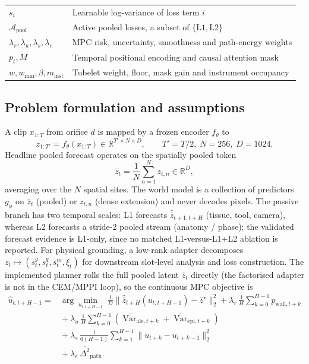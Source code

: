 \documentclass[preprint,12pt]{elsarticle}
\begin{document}
\begin{table}[t]
\begin{tabular}{@{}lp{}@{}}
$s_i$ & Learnable log-variance of loss term $i$ \\
$\mathcal{A}_{\mathrm{pool}}$ & Active pooled losses, a subset of $\{\mathrm{L1},\mathrm{L2}\}$ \\
$\lambda_r,\lambda_u,\lambda_s,\lambda_e$ & MPC risk, uncertainty, smoothness and path-energy weights \\
$p_t,M$ & Temporal positional encoding and causal attention mask \\
$w,w_{\min},\beta,m_{\mathrm{inst}}$ & Tubelet weight, floor, mask gain and instrument occupancy \\
\bottomrule
\end{tabular}
\end{table}

\subsection{Problem formulation and assumptions}
\label{sec:formulation}
A clip $x_{1:T}$ from orifice $d$ is mapped by a frozen encoder $f_\theta$ to
\begin{equation}
z_{1:T'}=f_\theta(x_{1:T})\in\mathbb{R}^{T'\times N\times D},\qquad T'=T/2,\; N=256,\; D=1024.
\label{eq:encode}
\end{equation}
Headline pooled forecast operates on the spatially pooled token
\begin{equation}
\bar z_t=\frac{1}{N}\sum_{n=1}^{N}z_{t,n}\in\mathbb{R}^{D},
\label{eq:pool}
\end{equation}
averaging over the $N$ spatial sites. The world model is a collection of
predictors $g_\phi$ on $\bar z_t$ (pooled) or $z_{t,n}$ (dense extension) and
never decodes pixels. The passive branch has two temporal scales:
L1 forecasts $\hat{\bar z}_{t+1:t+H}$ (tissue, tool, camera), whereas L2 forecasts a
stride-$2$ pooled stream (anatomy / phase); the validated forecast evidence is
L1-only, since no matched L1-versus-L1{+}L2 ablation is reported. For physical grounding, a low-rank
adapter decomposes $z_t\mapsto(s_t^g,s_t^q,s_t^m,\xi_t)$ for downstream
slot-level analysis and loss construction. The implemented planner rolls the
full pooled latent $\bar z_t$ directly (the factorised adapter is not in the
CEM/MPPI loop), so the continuous MPC objective is
\begin{equation}
\begin{aligned}
\hat u_{t:t+H-1}
={}&\arg\min_{u_{t:t+H-1}}\;
\frac{1}{D}\bigl\|\hat{\bar z}_{t+H}(u_{t:t+H-1})-\bar z^\star\bigr\|_2^2
+\lambda_r\,\frac{1}{H}\sum_{k=0}^{H-1}p_{\mathrm{wall},t+k}\\
&{}+\lambda_u\,\frac{1}{H}\sum_{k=0}^{H-1}
(\overline{\operatorname{Var}}_{\mathrm{ale},t+k}
+\overline{\operatorname{Var}}_{\mathrm{epi},t+k})
\\
&{}+\lambda_s\,\frac{1}{6(H-1)}\sum_{k=1}^{H-1}
\|u_{t+k}-u_{t+k-1}\|_2^2
\\
&{}+\lambda_e\,\overline{\Delta^2}_{\mathrm{path}} .
\end{aligned}
\label{eq:mpc}
\end{equation}
\end{document}
